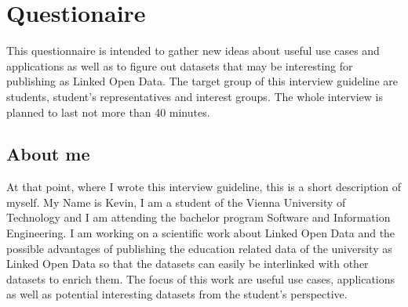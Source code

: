 \documentclass{article}
\begin{document}
\newpage

\printbibliography[title={References to refereed scientific work}, keyword=refsw]

\printbibliography[title={References to non-refereed work}, keyword=nonrefw]

\printbibliography[title={References to websites}, type=misc]

\newpage
\appendix


\section{Questionaire}
\label{questionaire}
This questionnaire is intended to gather new ideas about useful use cases and applications as well as to figure out datasets that may be interesting for publishing as Linked Open Data. The target group of this interview guideline are students, student’s representatives and interest groups. The whole interview is planned to last not more than 40 minutes.

\subsection{About me}
\label{questionaire:about-me}
At that point, where I wrote this interview guideline, this is a short description of myself. My Name is Kevin, I am a student of the Vienna University of Technology and I am attending the bachelor program Software and Information Engineering. I am working on a scientific work about Linked Open Data and the possible advantages of publishing the education related data of the university as Linked Open Data so that the datasets can easily be interlinked with other datasets to enrich them. The focus of this work are useful use cases, applications as well as potential interesting datasets from the student’s perspective.
\end{document}
